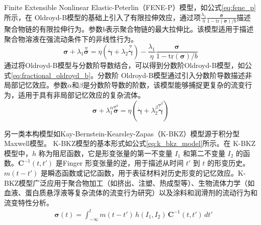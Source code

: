 ​​Finite Extensible Nonlinear Elastic-Peterlin（FENE-P）模型，如公式\eqref{eq:fene_p}所示，在 Oldroyd-B模型的基础上引入了有限拉伸效应，通过项$\frac{\lambda_1}{\eta} \frac{\boldsymbol{\sigma}}{1 - \text{tr}(\boldsymbol{\sigma})/b}$描述聚合物链的有限拉伸行为\cite{bird1980polymer}。参数$b$表示聚合物链的最大拉伸比。该模型适用于描述聚合物溶液在强流动条件下的非线性行为。
\begin{equation}
  \boldsymbol{\sigma} + \lambda_1 \stackrel{\triangledown}{\boldsymbol{\sigma}} = \eta \left( \dot{\boldsymbol{\gamma}} + \lambda_2 \stackrel{\triangledown}{\dot{\boldsymbol{\gamma}}} \right) - \frac{\lambda_1}{\eta} \frac{\boldsymbol{\sigma}}{1 - \text{tr}(\boldsymbol{\sigma})/b} \label{eq:fene_p}
\end{equation}
通过将Oldroyd-B模型与分数阶导数结合，可以得到分数阶Oldroyd-B模型，如公式\eqref{eq:fractional_oldroyd_b}。分数阶 Oldroyd-B模型通过引入分数阶导数描述非局部记忆效应\cite{qi2007stokes}。参数$\alpha$和$\beta$是分数阶导数的阶数，该模型能够捕捉更复杂的流变行为，适用于具有非局部记忆效应的复杂流体。
\begin{equation}
  \boldsymbol{\sigma} + \lambda_1^\alpha \stackrel{\triangledown^\alpha}{\boldsymbol{\sigma}} = \eta \left( \dot{\boldsymbol{\gamma}} + \lambda_2^\beta \stackrel{\triangledown^\beta}{\dot{\boldsymbol{\gamma}}} \right) \label{eq:fractional_oldroyd_b}
\end{equation}

另一类本构模型如Kay-Bernstein-Kearsley-Zapas（K-BKZ）模型源于积分型Maxwell模型\cite{kaye1962non,bernstein1963study}。
K-BKZ模型的基本形式如公式\eqref{eq:k_bkz_model}所示。在 K-BKZ 模型中，$h$ 称为阻尼函数，它是形变张量的第一不变量 $I_1$ 和第二不变量 $I_2$ 的函数。$\mathbf{C}^{-1}(t,t')$ 是Finger 形变张量的逆，用于描述从时间 $t'$ 到 $t$ 的形变历史。$m(t-t')$ 是瞬态函数或记忆函数，用于表征材料对历史形变的记忆效应。K-BKZ模型广泛应用于聚合物加工（如挤出、注塑、热成型等）、生物流体力学（如血液、蛋白质悬浮液等复杂流体的流变行为研究）以及涂料和润滑剂的流动行为和流变特性分析\cite{mitsoulis60YearsKayeBernstein2023}。
\begin{align}
   & \boldsymbol{\sigma}(t)  = \int_{-\infty}^t m(t-t') \, h(I_1, I_2) \, \mathbf{C}^{-1}(t,t') \, dt'    \label{eq:k_bkz_model}
\end{align}


